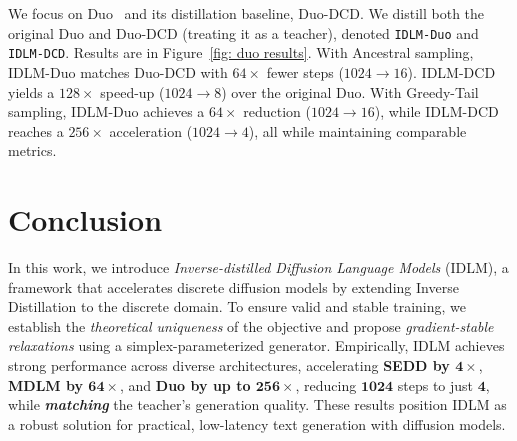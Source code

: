   We focus on Duo~\citep{sahoo2025the} and its distillation baseline, Duo-DCD. We distill both the original Duo and
Duo-DCD (treating it as a teacher), denoted \texttt{IDLM-Duo} and \texttt{IDLM-DCD}. Results are in Figure~\ref{fig: duo results}.
With Ancestral sampling, IDLM-Duo matches Duo-DCD with $64\times$ fewer steps ($1024 \to 16$).
IDLM-DCD yields a $128\times$ speed-up ($1024 \to 8$) over the original Duo. With Greedy-Tail sampling,
IDLM-Duo achieves a $64\times$ reduction ($1024 \to 16$), while IDLM-DCD reaches a $256\times$ acceleration ($1024 \to 4$),
all while maintaining comparable metrics.
\vspace{-3mm}
\section{Conclusion}
\vspace{-3mm}
\label{sec:conclusion}
In this work, we introduce \emph{Inverse-distilled Diffusion Language Models} (IDLM), a framework that accelerates
discrete diffusion models by extending Inverse Distillation to the discrete domain.
To ensure valid and stable training, we establish the \emph{theoretical uniqueness} of the objective and propose
\emph{gradient-stable relaxations} using a simplex-parameterized generator.
Empirically, IDLM achieves strong performance across diverse architectures, accelerating \textbf{SEDD by
  $\mathbf{4\times}$},
\textbf{MDLM by $\mathbf{64\times}$}, and \textbf{Duo by up to $\mathbf{256\times}$}, reducing $\mathbf{1024}$ steps to
just $\mathbf{4}$,
while \textit{\textbf{matching}} the teacher's generation quality.
These results position IDLM as a robust solution for practical, low-latency text generation with diffusion models.







